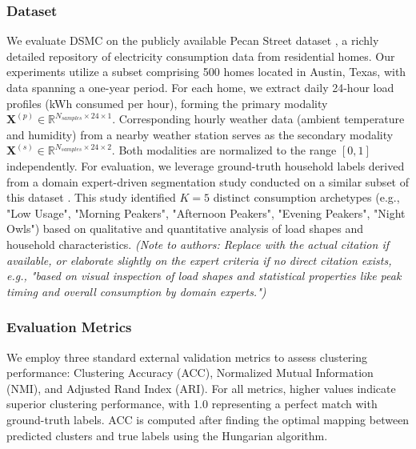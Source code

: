 \documentclass[journal]{IEEEtran}
\begin{document}
\subsubsection{Dataset}
We evaluate DSMC on the publicly available Pecan Street dataset \cite{pecan_street_dataset}, a richly detailed repository of electricity consumption data from residential homes. Our experiments utilize a subset comprising 500 homes located in Austin, Texas, with data spanning a one-year period. For each home, we extract daily 24-hour load profiles (kWh consumed per hour), forming the primary modality $\mathbf{X}^{(p)} \in \mathbb{R}^{N_{samples} \times 24 \times 1}$. Corresponding hourly weather data (ambient temperature and humidity) from a nearby weather station serves as the secondary modality $\mathbf{X}^{(s)} \in \mathbb{R}^{N_{samples} \times 24 \times 2}$. Both modalities are normalized to the range $[0, 1]$ independently. For evaluation, we leverage ground-truth household labels derived from a domain expert-driven segmentation study conducted on a similar subset of this dataset \cite{pecan_street_expert_study_placeholder}. This study identified $K=5$ distinct consumption archetypes (e.g., "Low Usage", "Morning Peakers", "Afternoon Peakers", "Evening Peakers", "Night Owls") based on qualitative and quantitative analysis of load shapes and household characteristics.
\textit{(Note to authors: Replace \cite{pecan_street_expert_study_placeholder} with the actual citation if available, or elaborate slightly on the expert criteria if no direct citation exists, e.g., "based on visual inspection of load shapes and statistical properties like peak timing and overall consumption by domain experts.")}

\subsubsection{Evaluation Metrics}
We employ three standard external validation metrics to assess clustering performance: Clustering Accuracy (ACC), Normalized Mutual Information (NMI), and Adjusted Rand Index (ARI). For all metrics, higher values indicate superior clustering performance, with 1.0 representing a perfect match with ground-truth labels. ACC is computed after finding the optimal mapping between predicted clusters and true labels using the Hungarian algorithm.
\end{document}
